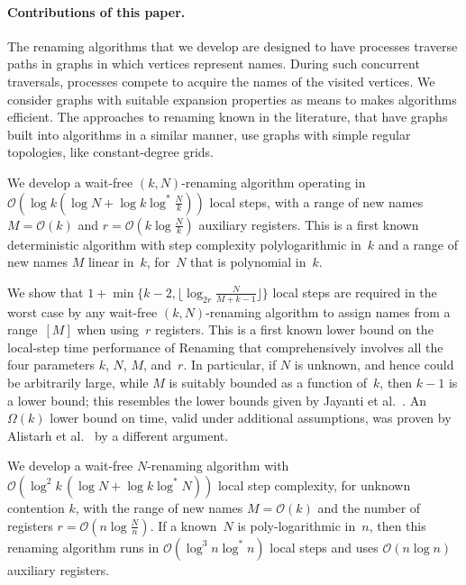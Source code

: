 \documentclass[11pt]{article}
\newcommand{\BBB}{\vspace*{-\bigskipamount}}
\newcommand{\cO}{\mathcal{O}}
\newcommand{\Paragraph}[1]{\BBB\paragraph{#1}}
\begin{document}
\Paragraph{Contributions of this paper.}


The renaming algorithms that we develop are designed to have processes traverse paths in graphs in which vertices represent names.
During such concurrent traversals, processes compete to acquire the names of the visited vertices.
We consider graphs with suitable expansion properties as means to makes algorithms efficient.
The approaches to renaming known in the literature, that have graphs built into algorithms in a similar manner, use graphs with  simple regular topologies, like constant-degree grids.

We develop a wait-free $(k,N)$-renaming algorithm operating in $\cO(\log k (\log N + \log k\log^* \frac{N}{k}))$ local steps, with a range of new names $M=\cO(k)$ and $r=\cO(k\log\frac{N}{k})$ auxiliary registers.
This is a first known deterministic algorithm with step complexity polylogarithmic in~$k$ and a range of new names $M$ linear in~$k$, for~$N$ that is polynomial in~$k$. 



We show that  $1+\min\{k-2,\lfloor\log_{2r} \frac{N}{M+k-1}\rfloor\}$ local steps are required in the worst case by any wait-free $(k,N)$-renaming algorithm to assign names from a  range~$[M]$ when using~$r$ registers.
This is a first known lower bound on the local-step time performance of Renaming  that comprehensively involves all the four parameters $k$, $N$, $M$, and~$r$.
In particular, if $N$ is unknown, and hence could be arbitrarily large, while $M$ is suitably bounded as a function of~$k$, then $k-1$ is a lower bound; this resembles the lower bounds given by Jayanti et al.~\cite{JayantiTT00}.
An $\Omega(k)$ lower bound on time, valid under additional assumptions, was proven by Alistarh et al.~\cite{AlistarhACGG14}   by a different argument.

We develop a wait-free $N$-renaming algorithm with $\cO(\log^2 k \,(\log N + \log k\log^\ast N))$ local step complexity, for unknown contention $k$, with the range of new names 
$M=\cO(k)$ and the number of registers $r=\cO(n\log\frac{N}{n})$. 
If a known~$N$ is poly-logarithmic in~$n$, then this renaming algorithm runs in $\cO(\log^3 n \log^\ast n)$ local steps and uses $\cO(n\log n)$ auxiliary registers.
\end{document}
